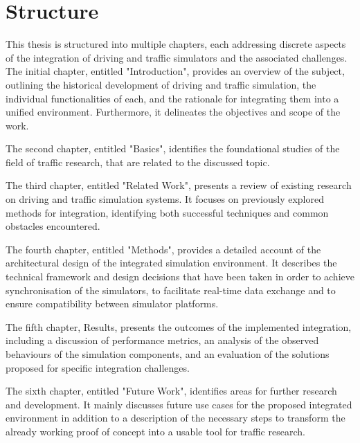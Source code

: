 \section{Structure}\label{sec:structure}
    This thesis is structured into multiple chapters, each addressing discrete aspects of the integration of driving and traffic simulators and the associated challenges.\\

    The initial chapter, entitled "Introduction", provides an overview of the subject, outlining the historical development of driving and traffic simulation, the individual functionalities of each, and the rationale for integrating them into a unified environment.
    Furthermore, it delineates the objectives and scope of the work.

    The second chapter, entitled "Basics", identifies the foundational studies of the field of traffic research, that are related to the discussed topic.

    The third chapter, entitled "Related Work", presents a review of existing research on driving and traffic simulation systems.
    It focuses on previously explored methods for integration, identifying both successful techniques and common obstacles encountered.

    The fourth chapter, entitled "Methods", provides a detailed account of the architectural design of the integrated simulation environment.
    It describes the technical framework and design decisions that have been taken in order to achieve synchronisation of the simulators, to facilitate real-time data exchange and to ensure compatibility between simulator platforms.

    The fifth chapter, Results, presents the outcomes of the implemented integration, including a discussion of performance metrics, an analysis of the observed behaviours of the simulation components, and an evaluation of the solutions proposed for specific integration challenges.

    The sixth chapter, entitled "Future Work", identifies areas for further research and development.
    It mainly discusses future use cases for the proposed integrated environment in addition to a description of the necessary steps to transform the already working proof of concept into a usable tool for traffic research.